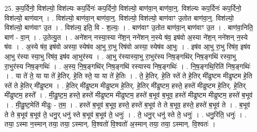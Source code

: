 \documentclass[17pt]{extarticle}
\begin{document}
25. क॒प॒र्दिनो॒ विश॑ल्यो॒ विश॑ल्यः कप॒र्दिनः॑ कप॒र्दिनो॒ विश॑ल्यो॒ बाण॑वा॒न् बाण॑वा॒न्॒. विश॑ल्यः कप॒र्दिनः॑ कप॒र्दिनो॒ विश॑ल्यो॒ बाण॑वान् । . विश॑ल्यो॒ बाण॑वा॒न् बाण॑वा॒न्॒. विश॑ल्यो॒ विश॑ल्यो॒ बाण॑वाꣳ उ॒तोत बाण॑वा॒न्॒. विश॑ल्यो॒ विश॑ल्यो॒ बाण॑वाꣳ उ॒त । . विश॑ल्य॒ इति॒ वि - श॒ल्यः॒ । . बाण॑वाꣳ उ॒तोत बाण॑वा॒न् बाण॑वाꣳ उ॒त । . बाण॑वा॒निति॒ बाण॑ - वा॒न् । . उ॒तेत्यु॒त । . अने॑शन् नस्या॒स्या ने॑श॒न् नने॑शन् न॒स्ये ष॑व॒ इष॑वो अ॒स्या ने॑श॒न् नने॑शन् न॒स्ये ष॑वः । . अ॒स्ये ष॑व॒ इष॑वो अस्या॒ स्येष॑व आ॒भु रा॒भु रिष॑वो अस्या॒ स्येष॑व आ॒भुः । . इष॑व आ॒भु रा॒भु रिष॑व॒ इष॑व आ॒भु र॑स्या स्या॒भु रिष॑व॒ इष॑व आ॒भुर॑स्य । . आ॒भु र॑स्यास्या॒भु रा॒भुर॑स्य निष॒ङ्गथि॑र् निष॒ङ्गथि॑ रस्या॒भु रा॒भुर॑स्य निष॒ङ्गथिः॑ । . अ॒स्य॒ नि॒ष॒ङ्गथि॑र् निष॒ङ्गथि॑ रस्यास्य निष॒ङ्गथिः॑ । . नि॒ष॒ङ्गथि॒रिति॑ निष॒ङ्गथिः॑ । . या ते॑ ते॒ या या ते॑ हे॒तिर्. हे॒ति स्ते॒ या या ते॑ हे॒तिः । . ते॒ हे॒तिर्. हे॒ति स्ते॑ ते हे॒तिर् मी॑ढुष्टम मीढुष्टम हे॒ति स्ते॑ ते हे॒तिर् मी॑ढुष्टम । . हे॒तिर् मी॑ढुष्टम मीढुष्टम हे॒तिर्. हे॒तिर् मी॑ढुष्टम॒ हस्ते॒ हस्ते॑ मीढुष्टम हे॒तिर्. हे॒तिर् मी॑ढुष्टम॒ हस्ते᳚ । . मी॒ढु॒ष्ट॒म॒ हस्ते॒ हस्ते॑ मीढुष्टम मीढुष्टम॒ हस्ते॑ ब॒भूव॑ ब॒भूव॒ हस्ते॑ मीढुष्टम मीढुष्टम॒ हस्ते॑ ब॒भूव॑ । . मी॒ढु॒ष्ट॒मेति॑ मीढुः - त॒म॒ । . हस्ते॑ ब॒भूव॑ ब॒भूव॒ हस्ते॒ हस्ते॑ ब॒भूव॑ ते ते ब॒भूव॒ हस्ते॒ हस्ते॑ ब॒भूव॑ ते । . ब॒भूव॑ ते ते ब॒भूव॑ ब॒भूव॑ ते॒ धनु॒र् धनु॑ स्ते ब॒भूव॑ ब॒भूव॑ ते॒ धनुः॑ । . ते॒ धनु॒र् धनु॑ स्ते ते॒ धनुः॑ । . धनु॒रिति॒ धनुः॑ । . तया॒ ऽस्मा न॒स्मान् तया॒ तया॒ ऽस्मान्. वि॒श्वतो॑ वि॒श्वतो॑ अ॒स्मान् तया॒ तया॒ ऽस्मान्. वि॒श्वतः॑ । \newline
\end{document}
